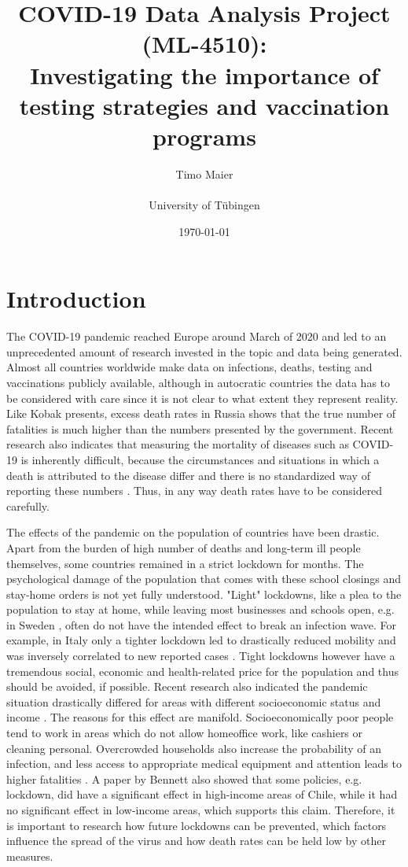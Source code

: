 \documentclass[a4paper,11pt]{article}
\title{\textbf{COVID-19 Data Analysis Project (ML-4510):\\
            Investigating the importance of testing strategies and vaccination programs}}
\author{
  Timo Maier\\ \\ University of Tübingen
}
\date{\today} %
\begin{document}
\maketitle

\section{Introduction}

The COVID-19 pandemic reached Europe around March of 2020 and led to an unprecedented amount of research invested in the topic and data being generated. Almost all countries worldwide make data on infections, deaths, testing and vaccinations publicly available, although in autocratic countries the data has to be considered with care since it is not clear to what extent they represent reality.
Like Kobak \cite{kobak2021excess} presents, excess death rates in Russia shows that the true number of fatalities is much higher than the numbers presented by the government. Recent research also indicates that measuring the mortality of diseases such as COVID-19 is inherently difficult, because the circumstances and situations in which a death is attributed to the disease differ and there is no standardized way of reporting these numbers \cite{kiang2020every}. Thus, in any way death rates have to be considered carefully.

The effects of the pandemic on the population of countries have been drastic. Apart from the burden of high number of deaths and long-term ill people themselves, some countries remained in a strict lockdown for months. The psychological damage of the population that comes with these school closings and stay-home orders is not yet fully understood. "Light" lockdowns, like a plea to the population to stay at home, while leaving most businesses and schools open, e.g. in Sweden \cite{pillai2020covid}, often do not have the intended effect to break an infection wave. For example, in Italy only a tighter lockdown led to drastically reduced mobility and was inversely correlated to new reported cases \cite{vinceti2020lockdown}. Tight lockdowns however have a tremendous social, economic and health-related price for the population \cite{fuller2021mitigation} and thus should be avoided, if possible. Recent research also indicated the pandemic situation drastically differed for areas with different socioeconomic status and income \cite{mena2021socioeconomic}. The reasons for this effect are manifold. Socioeconomically poor people tend to work in areas which do not allow
homeoffice work, like cashiers or cleaning personal. Overcrowded households
also increase the probability of an infection, and less access to appropriate
medical equipment and attention leads to higher fatalities \cite{mena2021socioeconomic}. A paper by Bennett \cite{bennett2021all} also showed that some policies,
e.g. lockdown, did have a significant effect in high-income areas of Chile, while it had no significant effect in low-income areas, which supports this claim.
Therefore, it is important to research how future lockdowns can be prevented, which factors influence the spread of the virus and how death rates can be held low by other measures.
\end{document}
